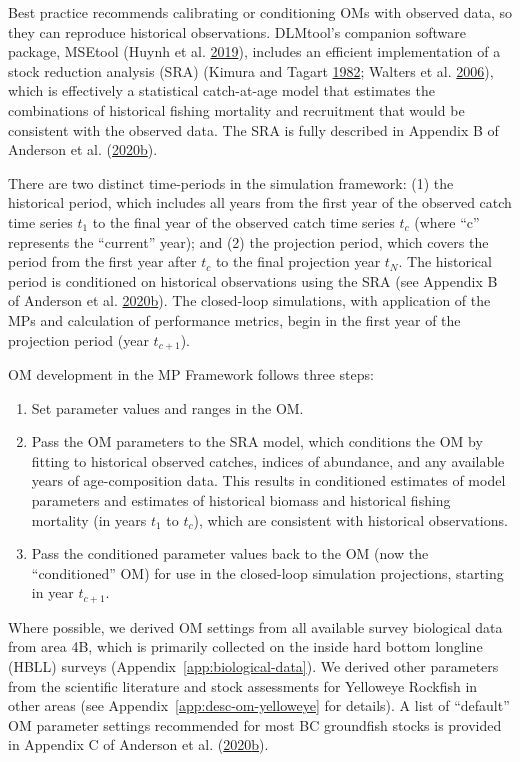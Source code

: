 \documentclass[11pt]{book}
\begin{document}
Best practice recommends calibrating or conditioning OMs with observed data, so they can reproduce historical observations. DLMtool's companion software package, MSEtool (Huynh et al. \protect\hyperlink{ref-huynh_msetool_2019}{2019}), includes an efficient implementation of a stock reduction analysis (SRA) (Kimura and Tagart \protect\hyperlink{ref-kimura1982}{1982}; Walters et al. \protect\hyperlink{ref-walters2006}{2006}), which is effectively a statistical catch-at-age model that estimates the combinations of historical fishing mortality and recruitment that would be consistent with the observed data. The SRA is fully described in Appendix B of Anderson et al. (\protect\hyperlink{ref-anderson2020gfmp}{2020}\protect\hyperlink{ref-anderson2020gfmp}{b}).

There are two distinct time-periods in the simulation framework: (1) the historical period, which includes all years from the first year of the observed catch time series \(t_1\) to the final year of the observed catch time series \(t_c\) (where ``c'' represents the ``current'' year); and (2) the projection period, which covers the period from the first year after \(t_c\) to the final projection year \(t_N\). The historical period is conditioned on historical observations using the SRA (see Appendix B of Anderson et al. \protect\hyperlink{ref-anderson2020gfmp}{2020}\protect\hyperlink{ref-anderson2020gfmp}{b}). The closed-loop simulations, with application of the MPs and calculation of performance metrics, begin in the first year of the projection period (year \(t_{c+1}\)).

OM development in the MP Framework follows three steps:
\begin{enumerate}
\def\labelenumi{\arabic{enumi}.}
\item
  Set parameter values and ranges in the OM.
\item
  Pass the OM parameters to the SRA model, which conditions the OM by fitting to historical observed catches, indices of abundance, and any available years of age-composition data. This results in conditioned estimates of model parameters and estimates of historical biomass and historical fishing mortality (in years \(t_1\) to \(t_c\)), which are consistent with historical observations.
\item
  Pass the conditioned parameter values back to the OM (now the ``conditioned'' OM) for use in the closed-loop simulation projections, starting in year \(t_{c+1}\).
\end{enumerate}
Where possible, we derived OM settings from all available survey biological data from area 4B, which is primarily collected on the inside hard bottom longline (HBLL) surveys (Appendix~\ref{app:biological-data}). We derived other parameters from the scientific literature and stock assessments for Yelloweye Rockfish in other areas (see Appendix~\ref{app:desc-om-yelloweye} for details). A list of ``default'' OM parameter settings recommended for most BC groundfish stocks is provided in Appendix C of Anderson et al. (\protect\hyperlink{ref-anderson2020gfmp}{2020}\protect\hyperlink{ref-anderson2020gfmp}{b}).
\end{document}
